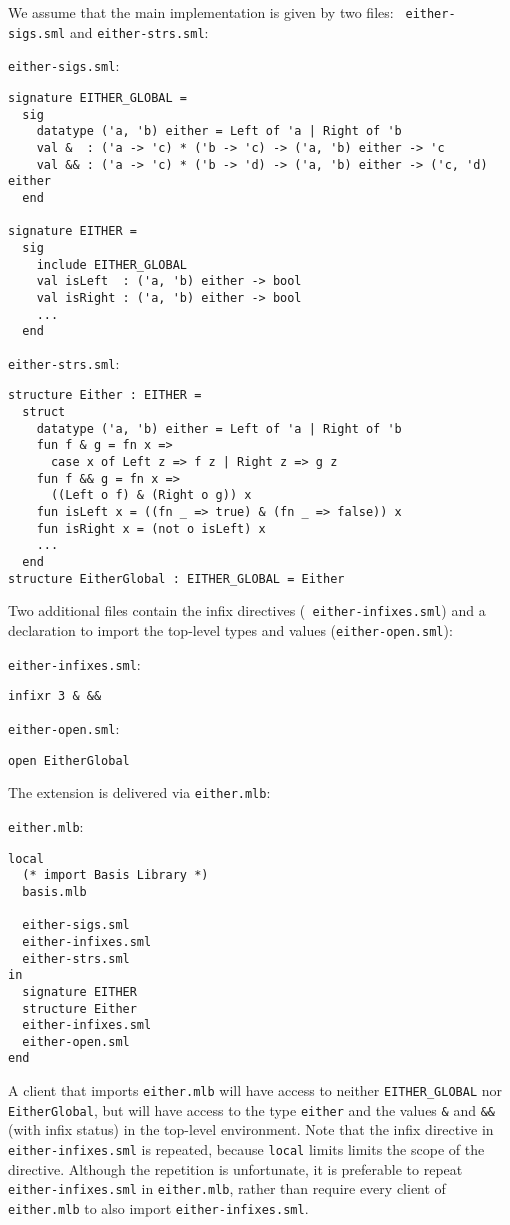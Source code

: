 We assume that the main implementation is given by two files: {\tt
either-sigs.sml} and {\tt either-strs.sml}:

\begin{description}
\item{{\tt either-sigs.sml}:}
\begin{verbatim}
signature EITHER_GLOBAL =
  sig
    datatype ('a, 'b) either = Left of 'a | Right of 'b
    val &  : ('a -> 'c) * ('b -> 'c) -> ('a, 'b) either -> 'c
    val && : ('a -> 'c) * ('b -> 'd) -> ('a, 'b) either -> ('c, 'd) either
  end

signature EITHER =
  sig
    include EITHER_GLOBAL
    val isLeft  : ('a, 'b) either -> bool
    val isRight : ('a, 'b) either -> bool
    ...
  end
\end{verbatim}
\item{{\tt either-strs.sml}:}
\begin{verbatim}
structure Either : EITHER =
  struct
    datatype ('a, 'b) either = Left of 'a | Right of 'b
    fun f & g = fn x =>
      case x of Left z => f z | Right z => g z
    fun f && g = fn x =>
      ((Left o f) & (Right o g)) x
    fun isLeft x = ((fn _ => true) & (fn _ => false)) x
    fun isRight x = (not o isLeft) x
    ...
  end
structure EitherGlobal : EITHER_GLOBAL = Either
\end{verbatim}
\end{description}

Two additional files contain the infix directives ({\tt
either-infixes.sml}) and a declaration to import the top-level types
and values ({\tt either-open.sml}):
\begin{description}
\item{{\tt either-infixes.sml}:}
\begin{verbatim}
infixr 3 & &&
\end{verbatim}
\item{{\tt either-open.sml}:}
\begin{verbatim}
open EitherGlobal
\end{verbatim}
\end{description}

The extension is delivered via {\tt either.mlb}:
\begin{description}
\item{{\tt either.mlb}:}
\begin{verbatim}
local
  (* import Basis Library *)
  basis.mlb

  either-sigs.sml
  either-infixes.sml
  either-strs.sml
in
  signature EITHER
  structure Either
  either-infixes.sml
  either-open.sml
end
\end{verbatim}
\end{description}
A client that imports {\tt either.mlb} will have access to neither
{\tt EITHER\_GLOBAL} nor {\tt EitherGlobal}, but will have access to
the type {\tt either} and the values {\tt \&} and {\tt \&\&} (with
infix status) in the top-level environment.  Note that the infix
directive in {\tt either-infixes.sml} is repeated, because {\tt local}
limits limits the scope of the directive.  Although the repetition is
unfortunate, it is preferable to repeat {\tt either-infixes.sml} in
{\tt either.mlb}, rather than require every client of {\tt either.mlb}
to also import {\tt either-infixes.sml}.

